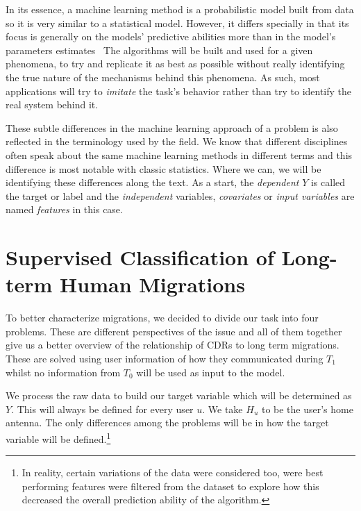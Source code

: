 In its essence, a machine learning method is a probabilistic model built from data so it is very similar to a statistical model. However, it differs specially in that its focus is generally on the models' predictive abilities more than in the model's parameters estimates~\textcite{breiman-statisticalmodeling} The algorithms will be built and used for a given phenomena, to try and replicate it as best as possible without really identifying the true nature of the mechanisms behind this phenomena. As such, most applications will try to \textit{imitate} the task's behavior rather than try to identify the real system behind it.


These subtle differences in the machine learning approach of a problem is also reflected in the terminology used by the field. We know that different disciplines often speak about the same machine learning methods in different terms and this difference is most notable with classic statistics. Where we can, we will be identifying these differences along the text. As a start, the \textit{dependent} $Y$ is called the target or label and the \textit{independent} variables, \textit{covariates} or \textit{input variables} are named \textit{features} in this case.

\section{Supervised Classification of Long-term Human Migrations}\label{long_term}

To better characterize migrations, we decided to divide our task into four problems. These are different perspectives of the issue and all of them together give us a better overview of the relationship of CDRs to long term migrations. These are solved using user information of how they communicated during $T_1$ whilst no information from $T_0$ will be used as input to the model.

We process the raw data to build our target variable which will be determined as $Y$. This will always be defined for every user $u$. We take $H_u$ to be the user's home antenna. The only differences among the problems will be in how the target variable will be defined.\footnote{In reality, certain variations of the data were considered too, were best performing features were filtered from the dataset to explore how this decreased the overall prediction ability of the algorithm.}


